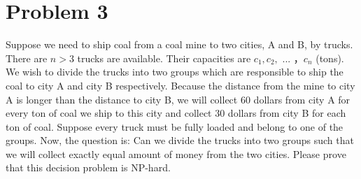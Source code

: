 \documentclass[12pt]{article}
\begin{document}
\section{Problem 3}
	Suppose we need to ship coal from a coal mine to two cities, A and B, by trucks. There are $n > 3$ trucks are available. Their capacities are $c_1, c_2,$ ...  $，c_n$ (tons). We wish to divide the trucks into two groups which are responsible to ship the coal to city A and city B respectively. Because the distance from the mine to city A is longer than the distance to city B, we will collect 60 dollars from city A for every ton of coal we ship to this city and collect 30 dollars from city B for each ton of coal. Suppose every truck must be fully loaded and belong to one of the groups. Now, the question is: Can we divide the trucks into two groups such that we will collect exactly equal amount of money from the two cities. Please prove that this decision problem is NP-hard.
\end{document}
